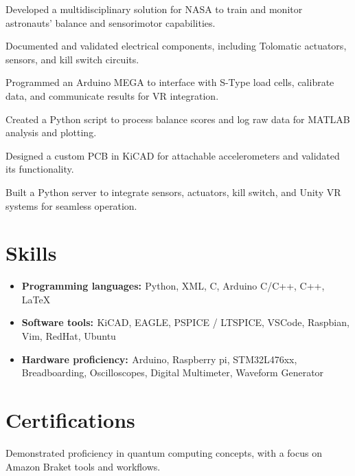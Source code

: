 \documentclass[a4paper]{comcv}
\begin{document}
\vspace{5 mm}
    \begin{tightlist}
        \item Developed a multidisciplinary solution for NASA to train and monitor astronauts' balance and sensorimotor capabilities.
        \item Documented and validated electrical components, including Tolomatic actuators, sensors, and kill switch circuits.
        \item Programmed an Arduino MEGA to interface with S-Type load cells, calibrate data, and communicate results for VR integration.
        \item Created a Python script to process balance scores and log raw data for MATLAB analysis and plotting.
        \item Designed a custom PCB in KiCAD for attachable accelerometers and validated its functionality.
        \item Built a Python server to integrate sensors, actuators, kill switch, and Unity VR systems for seamless operation.

\end{tightlist}
\smallskip


\section{Skills}
\smallskip
\begin{itemize}
    \item {\bf{Programming languages: }}  {Python, XML, C, Arduino C/C++, C++, \LaTeX} 
    \item {\bf{Software tools: }} {KiCAD, EAGLE, PSPICE / LTSPICE, VSCode, Raspbian, Vim, RedHat, Ubuntu}
    \item {\bf{Hardware proficiency: }}  {Arduino, Raspberry pi, STM32L476xx, Breadboarding, Oscilloscopes, Digital Multimeter, Waveform Generator} 
\end{itemize}
\smallskip

\section{Certifications}
\smallskip

\smallskip
\begin{tightlist}
    \item Demonstrated proficiency in quantum computing concepts, with a focus on Amazon Braket tools and workflows.
\end{tightlist}
\end{document}
